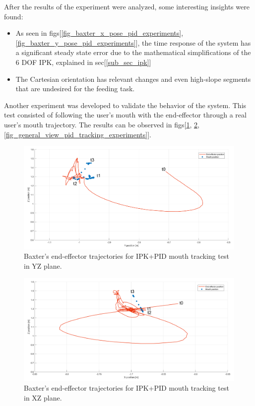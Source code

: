 \documentclass[11pt]{report} %
\begin{document}
After the results of the experiment were analyzed, some interesting insights were found:
\begin{itemize}
    \item As seen in figs[\ref{fig_baxter_x_pose_pid_experiments}, \ref{fig_baxter_y_pose_pid_experiments}], the time response of the system has a significant steady state error due to the mathematical simplifications of the 6 DOF IPK, explained in sec[\ref{sub_sec_ipk}]  
    \item The Cartesian orientation has relevant changes and even high-slope segments that are undesired for the feeding task. 
\end{itemize}

Another experiment was developed to validate the behavior of the system. This test consisted of following the user's mouth with the end-effector through a real user's mouth trajectory. The results can be observed in figs[\ref{fig_yz_view_pid_tracking_experiments}, \ref{fig_xz_view_pid_tracking_experiments}, \ref{fig_general_view_pid_tracking_experiments}].

\begin{figure}[H]
    \centering
    \includegraphics[width=1.0\linewidth]{assets/imgs/control_theory/pid_tracking/yz_view.png}
    \caption{Baxter's end-effector trajectories for IPK+PID mouth tracking test in YZ plane.} 
    \label{fig_yz_view_pid_tracking_experiments}
\end{figure}

\begin{figure}[H]
    \centering
    \includegraphics[width=1.0\linewidth]{assets/imgs/control_theory/pid_tracking/xz_view.png}
    \caption{Baxter's end-effector trajectories for IPK+PID mouth tracking test in XZ plane.} 
    \label{fig_xz_view_pid_tracking_experiments}
\end{figure}
\end{document}
